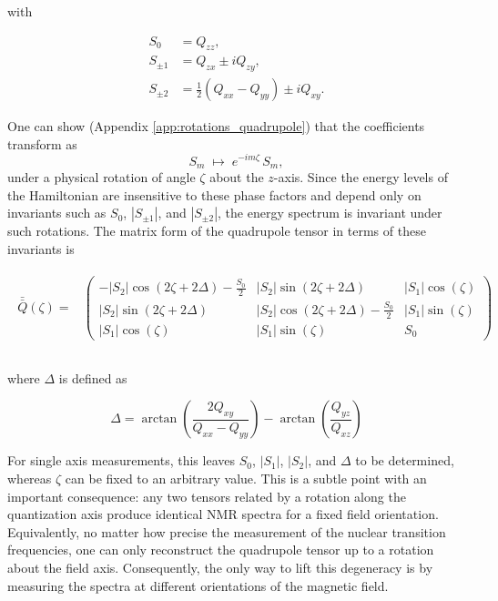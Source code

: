 \noindent with

\begin{equation}
\begin{aligned}
S_{0} &= Q_{zz}, \\
S_{\pm 1} &= Q_{zx} \pm i Q_{zy}, \\
S_{\pm 2} &= \tfrac{1}{2}(Q_{xx} - Q_{yy}) \pm i Q_{xy}.
\end{aligned}
\end{equation}

One can show (Appendix \ref{app:rotations_quadrupole}) that the coefficients transform as 
\begin{equation}
S_m \;\mapsto\; e^{-im\zeta}\, S_m,
\end{equation}
under a physical rotation of angle $\zeta$ about the $z$-axis. Since the energy levels of the Hamiltonian are insensitive to these phase factors and depend only on invariants such as $S_0$, $|S_{\pm 1}|$, and $|S_{\pm 2}|$, the energy spectrum is invariant under such rotations. The matrix form of the quadrupole tensor in terms of these invariants is

\begin{align}
\begin{split}
    \bar{\bar{Q}}(\zeta) =&\begin{pmatrix}
-|S_2| \cos(2\zeta+2\Delta)-\frac{S_0}{2}&  |S_2|\sin(2\zeta+2\Delta) & |S_1|\cos(\zeta) \\ 
|S_2| \sin(2\zeta+2\Delta)  & |S_2|\cos(2\zeta+2\Delta)-\frac{S_0}{2} & |S_1|\sin(\zeta) \\
|S_1|\cos(\zeta) & |S_1|\sin(\zeta) & S_0\end{pmatrix} \\\\
\end{split}
\end{align}

where $\Delta$ is defined as

\begin{equation}
\Delta = \arctan\left(\frac{2Q_{xy}}{Q_{xx}-Q_{yy}}\right) -  \arctan\left(\frac{Q_{yz}}{Q_{xz}}\right)
\end{equation}

For single axis measurements, this leaves $S_0$, $|S_1|$, $|S_2|$, and $\Delta$ to be determined, whereas $\zeta$ can be fixed to an arbitrary value. This is a subtle point with an important consequence: any two tensors related by a rotation along the quantization axis produce identical NMR spectra for a fixed field orientation. Equivalently, no matter how precise the measurement of the nuclear transition frequencies, one can only reconstruct the quadrupole tensor up to a rotation about the field axis. Consequently, the only way to lift this degeneracy is by measuring the spectra at different orientations of the magnetic field.

